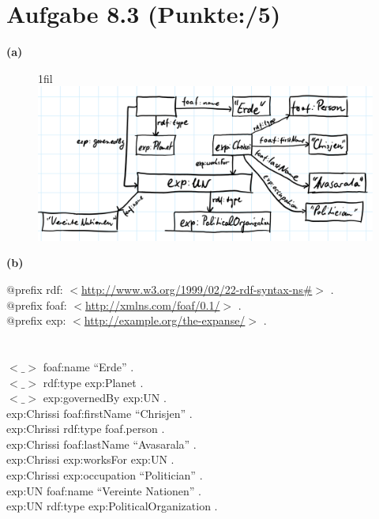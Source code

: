 \documentclass[11pt, a4paper]{article}
\makeatletter
\newcommand{\blattnummer}{8}
\newcommand{\ppp}{5}
\newcommand*{\centerfloat}{%
  \parindent \z@
  \leftskip \z@ \@plus 1fil \@minus \textwidth
  \rightskip\leftskip
  \parfillskip \z@skip}
\newcommand{\aufgabe}[2] {\section*{Aufgabe \blattnummer.#1 (Punkte:\qquad/#2)}}
\newcommand{\aufgabenteil}[1] {\textbf{(#1)}}
\makeatother
\begin{document}
\aufgabe{3}{\ppp}
\aufgabenteil{a}
\begin{figure}[h]
\centerfloat
\includegraphics[page=1,scale=0.5]{u08-3-a.PNG}
\end{figure}
\newpage
\aufgabenteil{b}
\begin{adjustwidth}{20pt}{20pt}
$@$prefix rdf: $<$\url{http://www.w3.org/1999/02/22-rdf-syntax-ns\#}$>$ .\\
$@$prefix foaf: $<$\url{http://xmlns.com/foaf/0.1/}$>$ .\\
$@$prefix exp: $<$\url{http://example.org/the-expanse/}$>$ .\\
\\ \ \\
$<\_>$ foaf:name ``Erde'' .\\
$<\_>$ rdf:type exp:Planet .\\
$<\_>$ exp:governedBy exp:UN .\\
exp:Chrissi foaf:firstName ``Chrisjen'' .\\
exp:Chrissi rdf:type foaf.person .\\
exp:Chrissi foaf:lastName ``Avasarala'' .\\
exp:Chrissi exp:worksFor exp:UN .\\
exp:Chrissi exp:occupation ``Politician'' .\\
exp:UN foaf:name ``Vereinte Nationen'' .\\
exp:UN rdf:type exp:PoliticalOrganization .\\
\end{adjustwidth}

\end{document}
